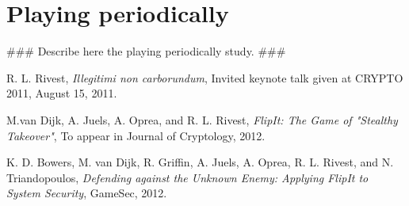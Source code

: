 \documentclass[a4paper]{article}
\begin{document}
\section{Playing periodically}
\#\#\# Describe here the playing periodically study. \#\#\#


\begin{thebibliography}{9}

  R. L. Rivest,
  \emph{Illegitimi non carborundum},
  Invited keynote talk given at CRYPTO 2011,
  August 15, 2011.

  M.van Dijk, A. Juels, A. Oprea, and R. L. Rivest,
  \emph{FlipIt: The Game of "Stealthy Takeover"},
  To appear in Journal of Cryptology,
  2012.

  K. D. Bowers, M. van Dijk, R. Griffin, A. Juels, A. Oprea, R. L. Rivest, and N. Triandopoulos,
  \emph{Defending against the Unknown Enemy: Applying FlipIt to System Security},
  GameSec,
  2012.

\end{thebibliography}
\end{document}
